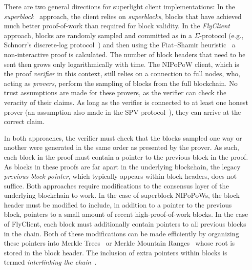 There are two general directions for superlight client implementations: In the
\emph{superblock}~\cite{nipopows,compactsuperblocks} approach, the client
relies on \emph{superblocks}, blocks that have achieved much better
proof-of-work than required for block validity. In the
\emph{FlyClient}~\cite{flyclient} approach, blocks are randomly sampled and committed as in a $\Sigma$-protocol (e.g., Schnorr's discrete-log protocol~\cite{schnorr}) and then using
the Fiat--Shamir heuristic~\cite{fiatshamir} a non-interactive proof is calculated. The number of block headers
that need to be sent then grows only logarithmically with time. The NIPoPoW
client, which is the proof \emph{verifier} in this context, still relies on a connection to full nodes,
who, acting as \emph{provers},  perform the sampling of blocks from the full
blockchain.
No trust assumptions are made for these provers, as the
verifier can check the veracity of their claims. As long as the verifier is
connected to at least one honest prover (an assumption also made in the SPV
protocol~\cite{eclipse,eclipse-ethereum}), they can arrive at the correct claim.

In both approaches, the verifier must check that the blocks
sampled one way or another were generated in the same order as presented by the prover. As such, each block in the proof must contain a
pointer to the previous block in the proof. As blocks in these proofs are far
apart in the underlying blockchain, the legacy \emph{previous block pointer},
which typically appears within block headers, does not suffice.
Both approaches require modifications to the consensus layer of the underlying
blockchain to work. In the case of superblock NIPoPoWs, the block header must be
modified to include, in addition to a pointer to the previous block, pointers to
a small amount of recent high-proof-of-work blocks. In the case of FlyClient,
each block must additionally contain pointers to all previous blocks in the
chain. Both of these modifications can be made efficiently by organizing these
pointers into Merkle Trees~\cite{merkle} or Merkle Mountain Ranges~\cite{ct,mmr}
whose root is stored in the block header. The inclusion of extra pointers within
blocks is termed \emph{interlinking the chain}~\cite{popow}.

